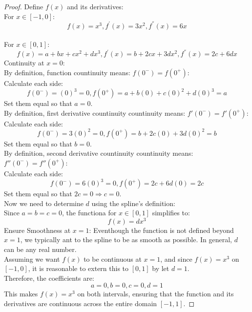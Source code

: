 \documentclass{article}
\begin{document}
\begin{proof}
    Define $f(x)$ and its derivatives:
    \\
    For $x \in [-1, 0]$:
    \[ f(x) = x^3, f^{'}(x) = 3x^2, f^{''}(x) = 6x \]
    \\
    For $x \in [0,1]$:
    \[ f(x) = a + bx + cx^2 + dx^3, f^{'}(x) = b + 2cx + 3dx^2, f^{''}(x) = 2c + 6dx \]
    Continuity at $x = 0$:
    \\
    By definition, function countinuity means: $f(0^{-}) = f(0^{+})$:
    \\
    Calculate each side:
    \[ f(0^{-}) = (0)^3 = 0, f(0^{+}) = a + b(0) + c(0)^2 + d(0)^3 = a \]
    Set them equal so that $a = 0$.
    \\
    By definition, first derivative countinuity countinuity means: $f{'}(0^{-}) = f{'}(0^{+})$:
    Calculate each side:
    \[ f(0^{-}) = 3(0)^2 = 0, f(0^{+}) = b + 2c(0) + 3d(0)^2 = b \]
    Set them equal so that $b = 0$.
    \\
    By definition, second derivative countinuity countinuity means: $f{''}(0^{-}) = f{''}(0^{+})$:
    \\
    Calculate each side:
    \[ f(0^{-}) = 6(0)^3 = 0, f(0^{+}) = 2c + 6d(0) = 2c \]
    Set them equal so that $2c = 0 \Rightarrow c = 0$.
    \\
    Now we need to determine $d$ using the spline's definition:
    \\
    Since $a = b = c = 0$, the functiona for $x \in [0,1]$ simplifies to:
    \[ f(x) = dx^3 \]
    Ensure Smoothness at $x = 1$:
    Eventhough the function is not defined beyond $x = 1$, we typically ant to the spline to be as smooth as possible. 
    In general, $d$ can be any real number.
    \\
    Assuming we want $f(x)$ to be continuous at $x = 1$, and since $f(x) = x^3$ on $[-1, 0]$, it is reasonable to extern this to $[0,1]$ by let $d = 1$.
    \\
    Therefore, the coefficients are:
    \[ a = 0, b = 0, c = 0, d = 1 \]
    This makes $f(x) = x^3$ on both intervals, ensuring that the function and its derivatives are continuous across the entire domain $[-1, 1]$.
\end{proof}
\end{document}
